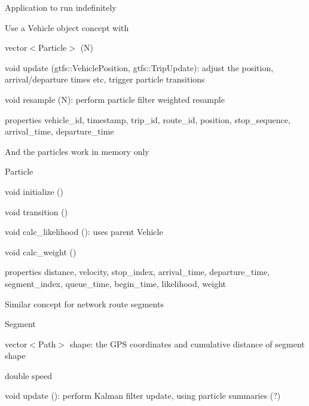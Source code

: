 \begin{DoxyItemize}
\item Application to run indefinitely
\item Use a {\ttfamily Vehicle} object concept with
\begin{DoxyItemize}
\item {\ttfamily vector$<$Particle$>$ (N)}
\item {\ttfamily void update (gtfs\+::\+Vehicle\+Position, gtfs\+::\+Trip\+Update)}\+: adjust the position, arrival/departure times etc, trigger particle transitions
\item {\ttfamily void resample (N)}\+: perform particle filter weighted resample
\item properties {\ttfamily vehicle\+\_\+id}, {\ttfamily timestamp}, {\ttfamily trip\+\_\+id}, {\ttfamily route\+\_\+id}, {\ttfamily position}, {\ttfamily stop\+\_\+sequence}, {\ttfamily arrival\+\_\+time}, {\ttfamily departure\+\_\+time}
\end{DoxyItemize}
\item And the particles work in memory only
\begin{DoxyItemize}
\item {\ttfamily Particle}
\begin{DoxyItemize}
\item {\ttfamily void initialize ()}
\item {\ttfamily void transition ()}
\item {\ttfamily void calc\+\_\+likelihood ()}\+: uses parent Vehicle
\item {\ttfamily void calc\+\_\+weight ()}
\item properties {\ttfamily distance}, {\ttfamily velocity}, {\ttfamily stop\+\_\+index}, {\ttfamily arrival\+\_\+time}, {\ttfamily departure\+\_\+time}, {\ttfamily segment\+\_\+index}, {\ttfamily queue\+\_\+time}, {\ttfamily begin\+\_\+time}, {\ttfamily likelihood}, {\ttfamily weight}
\end{DoxyItemize}
\end{DoxyItemize}
\item Similar concept for network route segments
\begin{DoxyItemize}
\item {\ttfamily Segment}
\begin{DoxyItemize}
\item {\ttfamily vector$<$Path$>$ shape}\+: the G\+PS coordinates and cumulative distance of segment shape
\item {\ttfamily double speed}
\item {\ttfamily void update ()}\+: perform Kalman filter update, using particle summaries (?)

\end{DoxyItemize}
\end{DoxyItemize}
\end{DoxyItemize}
